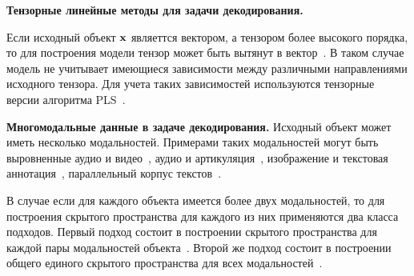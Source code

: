 \vspace{0.5cm}
\textbf{Тензорные линейные методы для задачи декодирования.}

Если исходный объект $\mathbf{x}$ являеттся вектором, а тензором более высокого порядка, то для построения модели тензор может быть вытянут в вектор~\cite{cichocki2009nonnegative}. 
В таком случае модель не учитывает имеющиеся зависимости между различными направлениями исходного тензора.
Для учета таких зависимостей используются тензорные версии алгоритма PLS~\cite{zhao2012higher,eliseyev2013recursive,eliseyev2016penalized}.


\vspace{0.5cm}
\textbf{Многомодальные данные в задаче декодирования.}
Исходный объект может иметь несколько модальностей. 
Примерами таких модальностей могут быть выровненные аудио и видео~\cite{kidron2005pixels,chaudhuri2009multi}, аудио и артикуляция~\cite{arora2012kernel}, изображение и текстовая аннотация~\cite{hardoon2004canonical,socher2010connecting,hodosh2013framing}, параллельный корпус текстов~\cite{vinokourov2003inferring,haghighi2008learning,ap2014autoencoder,faruqui2014improving}.

В случае если для каждого объекта имеется более двух модальностей, то для построения скрытого пространства для каждого из них применяются два класса подходов. 
Первый подход состоит в построении скрытого пространства для каждой пары модальностей объекта~\cite{masci2013multimodal,rajendran2015bridge}. 
Второй же подход состоит в построении общего единого скрытого пространства для всех модальностей~\cite{kumar2011co,sharma2012generalized}.